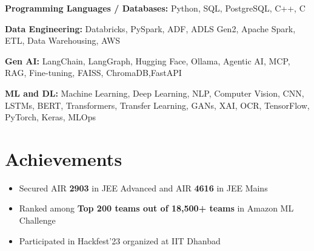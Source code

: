 \documentclass[a4paper,10pt]{article}
\begin{document}
\small

\textbf{Programming Languages / Databases:}
Python, SQL, PostgreSQL, C++, C

\vspace{2pt}

\textbf{Data Engineering:}
Databricks, PySpark, ADF, ADLS Gen2, Apache Spark, ETL, Data Warehousing, AWS

\vspace{2pt}

\textbf{Gen AI:}
LangChain, LangGraph, Hugging Face, Ollama, Agentic AI, MCP, RAG, Fine-tuning, FAISS, ChromaDB,FastAPI

\vspace{2pt}

\textbf{ML and DL:}
Machine Learning, Deep Learning, NLP, Computer Vision, CNN, LSTMs, BERT, Transformers, Transfer Learning, GANs, XAI, OCR, TensorFlow, PyTorch, Keras, MLOps





\section{Achievements}

\begin{itemize}
[leftmargin=0.18in,itemsep=2pt]

\item Secured AIR \textbf{2903} in JEE Advanced and AIR \textbf{4616} in JEE Mains

\item Ranked among \textbf{Top 200 teams out of 18,500+ teams} in Amazon ML Challenge

\item Participated in Hackfest'23 organized at IIT Dhanbad

\end{itemize}
\end{document}
